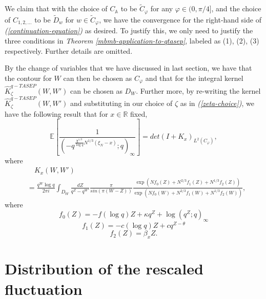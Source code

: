 We claim that with the choice of $C_{\mathbb{A}}$ to be $\tilde{C}_{\varphi}$ for any $\varphi \in (0, \pi / 4]$, and the choice of $C_{1, 2, \dots}$ to be $\tilde{D}_{w}$ for $w \in \tilde{C}_{\varphi}$, we have the convergence for the right-hand side of \textit{(\ref{continuation-equation})} as desired. To justify this, we only need to justify the three conditions in \textit{Theorem \ref{mbmb-application-to-qtasep}}, labeled as (1), (2), (3) respectively. Further details are omitted. 

By the change of variables that we have discussed in last section, we have that the contour for $W$ can then be chosen as $C_{\varphi}$ and that for the integral kernel $\hat{K}_{\zeta}^{q-TASEP}(W,W')$ can be chosen as $D_W$. Further more, by re-writing the kernel $\hat{K}_{\zeta}^{q-TASEP}(W,W')$ and substituting in our choice of $\zeta$ as in \textit{(\ref{zeta-choice})}, we have the following result that for $x \in \mathbb{R}$ fixed, 
\begin{equation}
\label{new-equality-mb-type-2}
\mathbb{E} \left[ \frac{1}{( -q^{ \frac{\chi^{1/3}}{\log q} N^{1/3} (\xi_N - x) }; q )_{\infty}} \right] = det(I+K_x)_{L^2(C_{\varphi})},
\end{equation}
where 
\begin{align*}
& \quad K_x(W,W') \\
& = \frac{q^W \log q}{2 \pi i} \int_{D_W} \frac{dZ}{q^Z - q^{W'}} \frac{\pi}{sin(\pi (W-Z))} \frac{\exp(Nf_0(Z) + N^{2/3} f_1(Z) + N^{1/3} f_2(Z))}{\exp(Nf_0(W) + N^{2/3} f_1(W) + N^{1/3} f_2(W))},
\end{align*}
where
\begin{equation*}
f_0(Z) = -f (\log q) Z + \kappa q^Z + \log(q^Z; q)_{\infty}
\end{equation*}
\begin{equation*}
f_1(Z) = -c (\log q) Z + cq^{Z - \theta}
\end{equation*}
\begin{equation*}
f_2(Z) = \beta_x Z.
\end{equation*}
\section{Distribution of the rescaled fluctuation}
